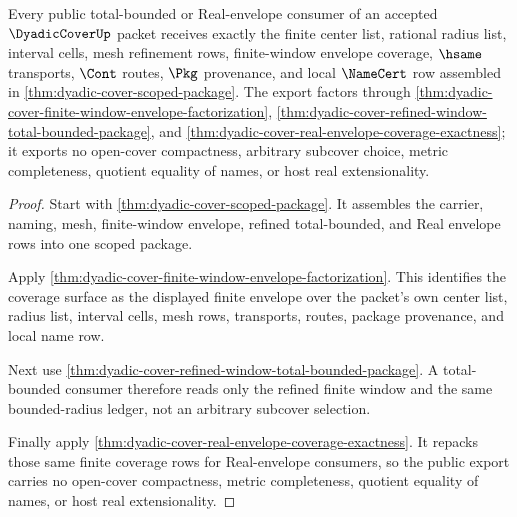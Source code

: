 \begin{theorem}
\label{thm:dyadic-cover-public-total-bounded-export}
Every public total-bounded or Real-envelope consumer of an accepted $\DyadicCoverUp$ packet receives exactly the finite center list, rational radius list, interval cells, mesh refinement rows, finite-window envelope coverage, $\hsame$ transports, $\Cont$ routes, $\Pkg$ provenance, and local $\NameCert$ row assembled in \autoref{thm:dyadic-cover-scoped-package}. The export factors through \autoref{thm:dyadic-cover-finite-window-envelope-factorization}, \autoref{thm:dyadic-cover-refined-window-total-bounded-package}, and \autoref{thm:dyadic-cover-real-envelope-coverage-exactness}; it exports no open-cover compactness, arbitrary subcover choice, metric completeness, quotient equality of names, or host real extensionality.
\end{theorem}
\begin{proof}
Start with \autoref{thm:dyadic-cover-scoped-package}. It assembles the carrier, naming, mesh, finite-window envelope, refined total-bounded, and Real envelope rows into one scoped package.

Apply \autoref{thm:dyadic-cover-finite-window-envelope-factorization}. This identifies the coverage surface as the displayed finite envelope over the packet's own center list, radius list, interval cells, mesh rows, transports, routes, package provenance, and local name row.

Next use \autoref{thm:dyadic-cover-refined-window-total-bounded-package}. A total-bounded consumer therefore reads only the refined finite window and the same bounded-radius ledger, not an arbitrary subcover selection.

Finally apply \autoref{thm:dyadic-cover-real-envelope-coverage-exactness}. It repacks those same finite coverage rows for Real-envelope consumers, so the public export carries no open-cover compactness, metric completeness, quotient equality of names, or host real extensionality.
\end{proof}

